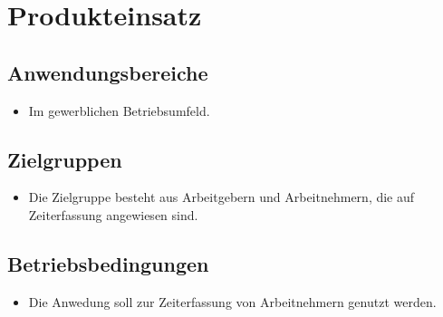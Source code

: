 \section{Produkteinsatz}

\subsection{Anwendungsbereiche}
\begin{itemize}
	\item Im gewerblichen Betriebsumfeld.
\end{itemize}

\subsection{Zielgruppen}
\begin{itemize}
	\item Die Zielgruppe besteht aus Arbeitgebern und Arbeitnehmern, die auf Zeiterfassung angewiesen sind.
\end{itemize}

\subsection{Betriebsbedingungen}
\begin{itemize}
	\item Die Anwedung soll zur Zeiterfassung von Arbeitnehmern genutzt werden.
\end{itemize}